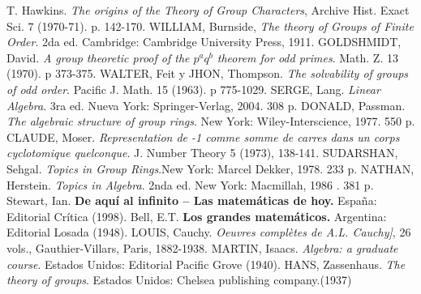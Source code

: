 \begin{thebibliography}{99}
     T. Hawkins. \textit{The origins of the Theory of Group Characters}, Archive Hist. Exact Sci. $7$ (1970-71). p. 142-170.
     WILLIAM, Burnside, \textit{The theory of Groups of Finite Order}. 	2da ed. Cambridge: Cambridge University Press, 1911.
      GOLDSHMIDT, David. \textit{A group theoretic proof of the $p^aq^b$ theorem for odd primes}. Math. Z. 13 (1970). p 373-375.
     WALTER, Feit y JHON, Thompson. \textit{The solvability of groups of odd order}. Pacific J. Math. 15 (1963). p 775-1029.
    SERGE, Lang. \textit{Linear Algebra}. 3ra ed. Nueva York: Springer-Verlag, 2004. 308 p.
     DONALD, Passman. \textit{The algebraic structure of group rings}. New York: Wiley-Interscience, 1977. 550 p.
     CLAUDE, Moser. \textit{Representation de -1 comme somme de carres dans un corps cyclotomique quelconque}. J. Number Theory 5 (1973), 138-141.
     SUDARSHAN, Sehgal.  \textit{Topics in Group Rings}.New York: Marcel Dekker, 1978. 233 p. 
     NATHAN, Herstein. \textit{Topics in Algebra}. 2nda ed.  New York: Macmillah, 1986 . 381 p. 
     Stewart, Ian. \textbf{De aquí al infinito -- Las matemáticas de hoy.} España: Editorial Crítica (1998).
     Bell, E.T. \textbf{Los grandes matemáticos.} Argentina: Editorial Losada (1948).
     LOUIS, Cauchy. \textit{Oeuvres complètes de A.L. Cauchy]}, 26 vols., Gauthier-Villars, Paris, 1882-1938.
	MARTIN, Isaacs. \textit{Algebra: a graduate course}. Estados Unidos: Editorial Pacific Grove (1940).
	 HANS, Zassenhaus. \textit{The theory of groups}. Estados Unidos: Chelsea publishing company.(1937) 
\end{thebibliography}
